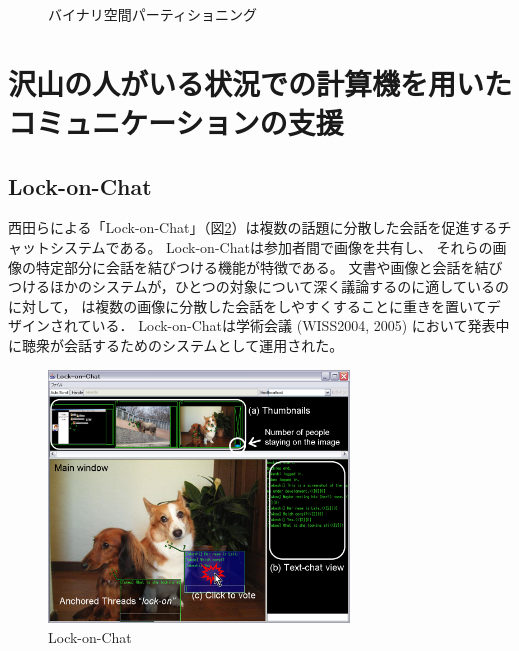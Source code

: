 \begin{figure}[H]
\centering
{}
\caption{バイナリ空間パーティショニング}
\label{hertzog}
\end{figure}


\section{沢山の人がいる状況での計算機を用いたコミュニケーションの支援}

\subsection{Lock-on-Chat}

西田らによる「Lock-on-Chat\cite{nishida2006}」（図\ref{lockonchat}）は複数の話題に分散した会話を促進するチャットシステムである。
Lock-on-Chatは参加者間で画像を共有し、
それらの画像の特定部分に会話を結びつける機能が特徴である。
文書や画像と会話を結びつけるほかのシステムが，ひとつの対象について深く議論するのに適しているのに対して，
は複数の画像に分散した会話をしやすくすることに重きを置いてデザインされている．
Lock-on-Chatは学術会議 (WISS2004, 2005) において発表中に聴衆が会話するためのシステムとして運用された。

\begin{figure}[H]
\centering
\includegraphics[width=8cm]{images/lockonchat.png}
\caption{Lock-on-Chat}
\label{lockonchat}
\end{figure}


